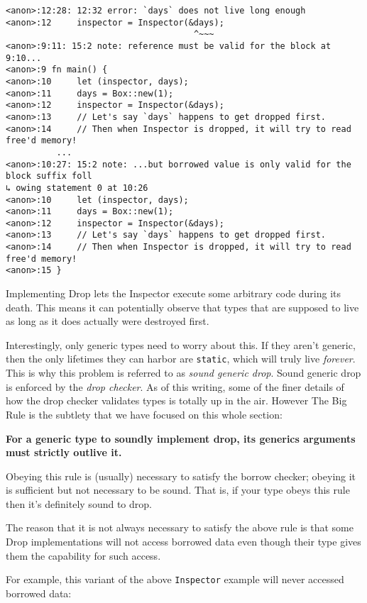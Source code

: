 \documentclass[a4paper,]{book}
\begin{document}
\begin{verbatim}
<anon>:12:28: 12:32 error: `days` does not live long enough
<anon>:12     inspector = Inspector(&days);
                                     ^~~~
<anon>:9:11: 15:2 note: reference must be valid for the block at 9:10...
<anon>:9 fn main() {
<anon>:10     let (inspector, days);
<anon>:11     days = Box::new(1);
<anon>:12     inspector = Inspector(&days);
<anon>:13     // Let's say `days` happens to get dropped first.
<anon>:14     // Then when Inspector is dropped, it will try to read free'd memory!
          ...
<anon>:10:27: 15:2 note: ...but borrowed value is only valid for the block suffix foll
↳ owing statement 0 at 10:26
<anon>:10     let (inspector, days);
<anon>:11     days = Box::new(1);
<anon>:12     inspector = Inspector(&days);
<anon>:13     // Let's say `days` happens to get dropped first.
<anon>:14     // Then when Inspector is dropped, it will try to read free'd memory!
<anon>:15 }
\end{verbatim}

Implementing Drop lets the Inspector execute some arbitrary code during
its death. This means it can potentially observe that types that are
supposed to live as long as it does actually were destroyed first.

Interestingly, only generic types need to worry about this. If they
aren't generic, then the only lifetimes they can harbor are
\texttt{\textquotesingle{}static}, which will truly live \emph{forever}.
This is why this problem is referred to as \emph{sound generic drop}.
Sound generic drop is enforced by the \emph{drop checker}. As of this
writing, some of the finer details of how the drop checker validates
types is totally up in the air. However The Big Rule is the subtlety
that we have focused on this whole section:

\textbf{For a generic type to soundly implement drop, its generics
arguments must strictly outlive it.}

Obeying this rule is (usually) necessary to satisfy the borrow checker;
obeying it is sufficient but not necessary to be sound. That is, if your
type obeys this rule then it's definitely sound to drop.

The reason that it is not always necessary to satisfy the above rule is
that some Drop implementations will not access borrowed data even though
their type gives them the capability for such access.

For example, this variant of the above \texttt{Inspector} example will
never accessed borrowed data:
\end{document}
